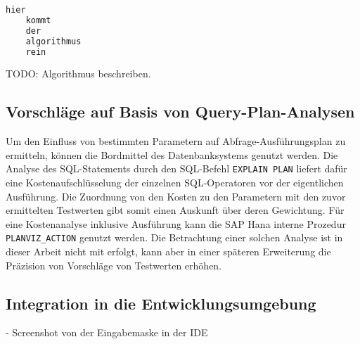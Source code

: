 \begin{lstlisting}[caption={Eingaben von Testwert-Konstellationen erweitern gegebenenfalls das Datenmodell}, label={lst:developerinput}, language=Python]
	hier
	kommt
	der
	algorithmus
	rein
\end{lstlisting}

TODO: Algorithmus beschreiben.

\subsection{Vorschläge auf Basis von Query-Plan-Analysen}
Um den Einfluss von bestimmten Parametern auf Abfrage-Ausführungsplan zu ermitteln, können die Bordmittel des Datenbanksystems genutzt werden.
Die Analyse des SQL-Statements durch den SQL-Befehl \texttt{EXPLAIN PLAN} liefert dafür eine Kostenaufschlüsselung der einzelnen SQL-Operatoren vor der eigentlichen Ausführung.
Die Zuordnung von den Kosten zu den Parametern mit den zuvor ermittelten Testwerten gibt somit einen Auskunft über deren Gewichtung.
Für eine Kostenanalyse inklusive Ausführung kann die SAP Hana interne Prozedur \texttt{PLANVIZ\_ACTION} genutzt werden.
Die Betrachtung einer solchen Analyse ist in dieser Arbeit nicht mit erfolgt, kann aber in einer späteren Erweiterung die Präzision von Vorschläge von Testwerten erhöhen.

\subsection{Integration in die Entwicklungsumgebung}
- Screenshot von der Eingabemaske in der IDE
